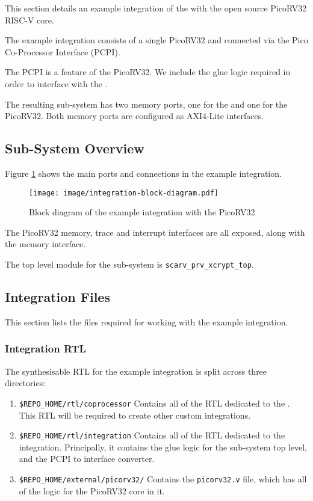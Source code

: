 
This section details an example integration of the \COP with
the open source PicoRV32 RISC-V core.

The example integration consists of a single PicoRV32 and \COP
connected via the Pico Co-Processor Interface (PCPI).

The PCPI is a feature of the PicoRV32.
We include the glue logic required in order to interface with the \COP.

The resulting sub-system has two memory ports, one for the \COP and one
for the PicoRV32.
Both memory ports are configured as AXI4-Lite interfaces.

\subsection{Sub-System Overview}

Figure \ref{fig:integration-block} shows the main ports and connections in
the example integration.

\begin{figure}[h]
\centering
\texttt{[image: image/integration-block-diagram.pdf]}
\caption{Block diagram of the example \COP integration with the PicoRV32}
\label{fig:integration-block}
\end{figure}

The PicoRV32 memory, trace and interrupt interfaces are all exposed, along
with the \COP memory interface.

The top level module for the sub-system is {\tt scarv\_prv\_xcrypt\_top}.


\subsection{Integration Files}

This section lists the files required for working with the example
integration.

\subsubsection{Integration RTL}

The synthesisable RTL for the example integration is split across three
directories:

\begin{enumerate}
\item {\tt \$REPO\_HOME/rtl/coprocessor} Contains all of the RTL dedicated
    to the \COP.
    This RTL will be required to create other custom integrations.
\item {\tt \$REPO\_HOME/rtl/integration} Contains all of the RTL dedicated
    to the integration.
    Principally, it contains the glue logic for the
    sub-system top level, and the PCPI to \COP interface converter.
\item {\tt \$REPO\_HOME/external/picorv32/} Contains the {\tt picorv32.v}
    file, which has all of the logic for the PicoRV32 core in it.
\end{enumerate}

